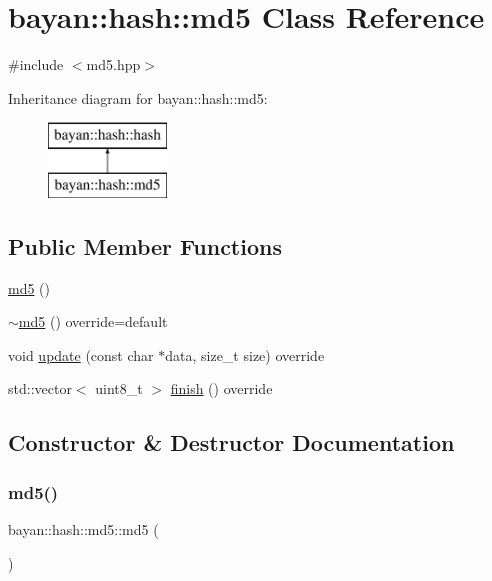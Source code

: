 \hypertarget{classbayan_1_1hash_1_1md5}{}\section{bayan\+:\+:hash\+:\+:md5 Class Reference}
\label{classbayan_1_1hash_1_1md5}


{\ttfamily \#include $<$md5.\+hpp$>$}

Inheritance diagram for bayan\+:\+:hash\+:\+:md5\+:\begin{figure}[H]
\begin{center}
\leavevmode
\includegraphics[height=2.000000cm]{classbayan_1_1hash_1_1md5}
\end{center}
\end{figure}
\subsection*{Public Member Functions}
\begin{DoxyCompactItemize}
\item 
\hyperlink{classbayan_1_1hash_1_1md5_a387a2c50afbcf62d3601a5436d3b7331}{md5} ()
\item 
\hyperlink{classbayan_1_1hash_1_1md5_a76f7a0803576bd2746bca20a985407c4}{$\sim$md5} () override=default
\item 
void \hyperlink{classbayan_1_1hash_1_1md5_abfa472bb4db577181800004c0996236f}{update} (const char $\ast$data, size\+\_\+t size) override
\item 
std\+::vector$<$ uint8\+\_\+t $>$ \hyperlink{classbayan_1_1hash_1_1md5_ade79012c138da38c8b08555dd48f637d}{finish} () override
\end{DoxyCompactItemize}


\subsection{Constructor \& Destructor Documentation}
\mbox{\label{classbayan_1_1hash_1_1md5_a387a2c50afbcf62d3601a5436d3b7331}} 
\subsubsection{\texorpdfstring{md5()}{md5()}}
{\footnotesize\ttfamily bayan\+::hash\+::md5\+::md5 (\begin{DoxyParamCaption}{ }\end{DoxyParamCaption})}

